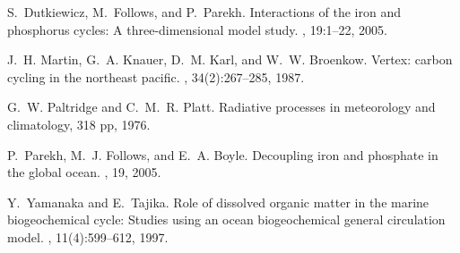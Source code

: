 \begin{thebibliography}{1}

S.~Dutkiewicz, M.~Follows, and P.~Parekh.
\newblock Interactions of the iron and phosphorus cycles: A three-dimensional
  model study.
, 19:1--22, 2005.

J.~H. Martin, G.~A. Knauer, D.~M. Karl, and W.~W. Broenkow.
\newblock Vertex: carbon cycling in the northeast pacific.
,
  34(2):267--285, 1987.

G.~W. Paltridge and C.~M.~R. Platt.
\newblock Radiative processes in meteorology and climatology, 318 pp, 1976.

P.~Parekh, M.~J. Follows, and E.~A. Boyle.
\newblock Decoupling iron and phosphate in the global ocean.
, 19, 2005.

Y.~Yamanaka and E.~Tajika.
\newblock Role of dissolved organic matter in the marine biogeochemical cycle:
  Studies using an ocean biogeochemical general circulation model.
, 11(4):599--612, 1997.

\end{thebibliography}
